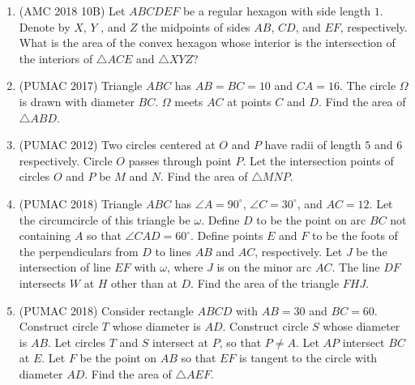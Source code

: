 \documentclass[12pt]{scrartcl}
\begin{document}
\begin{enumerate}[resume]
    \item (AMC 2018 10B) Let $ABCDEF$ be a regular hexagon with side length $1$. Denote by $X$, $Y$ , and $Z$ the midpoints of sides $AB$, $CD$, and $EF$, respectively. What is the area of the convex hexagon whose interior is the intersection of the interiors of $\triangle ACE$ and $\triangle XYZ$?


    \item (PUMAC 2017) Triangle $ABC$ has $AB = BC = 10$ and $CA = 16$. The circle $\Omega$ is drawn with diameter $BC$. $\Omega$ meets $AC$ at points $C$ and $D$. Find the area of $\triangle ABD$.


    \item (PUMAC 2012) Two circles centered at $O$ and $P$ have radii of length $5$ and $6$ respectively. Circle $O$ passes through point $P$. Let the intersection points of circles $O$ and $P$ be $M$ and $N$. Find the area of $\triangle MNP$.


    \item (PUMAC 2018) Triangle $ABC$ has $\angle A = 90^\circ$, $\angle C = 30^\circ$, and $AC = 12$. Let the circumcircle of this triangle be $\omega$. Define $D$ to be the point on arc $BC$ not containing $A$ so that $\angle CAD = 60^\circ$. Define points $E$ and $F$ to be the foots of the perpendiculars from $D$ to lines $AB$ and $AC$, respectively. Let $J$ be the intersection of line $EF$ with $\omega$, where $J$ is on the minor arc $AC$. The line $DF$ intersects $W$ at $H$ other than at $D$. Find the area of the triangle $FHJ$.


    \item (PUMAC 2018) Consider rectangle $ABCD$ with $AB = 30$ and $BC = 60$. Construct circle $T$ whose diameter is $AD$. Construct circle $S$ whose diameter is $AB$. Let circles $T$ and $S$ intersect at $P$, so that $P \neq A$. Let $AP$ intersect $BC$ at $E$. Let $F$ be the point on $AB$ so that $EF$ is tangent to the circle with diameter $AD$. Find the area of $\triangle AEF$.
\end{enumerate}
\end{document}
